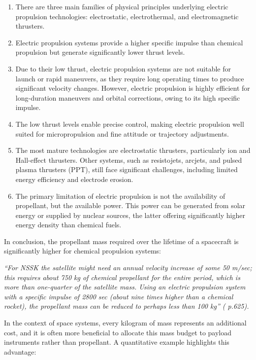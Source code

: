 \begin{enumerate}
	\item There are three main families of physical principles underlying electric propulsion technologies: electrostatic, electrothermal, and electromagnetic thrusters.
	\item Electric propulsion systems provide a higher specific impulse than chemical propulsion but generate significantly lower thrust levels.
	\item Due to their low thrust, electric propulsion systems are not suitable for launch or rapid maneuvers, as they require long operating times to produce significant velocity changes. However, electric propulsion is highly efficient for long-duration maneuvers and orbital corrections, owing to its high specific impulse.
	\item The low thrust levels enable precise control, making electric propulsion well suited for micropropulsion and fine attitude or trajectory adjustments.
	\item The most mature technologies are electrostatic thrusters, particularly ion and Hall-effect thrusters. Other systems, such as resistojets, arcjets, and pulsed plasma thrusters (PPT), still face significant challenges, including limited energy efficiency and electrode erosion.
	\item The primary limitation of electric propulsion is not the availability of propellant, but the available power. This power can be generated from solar energy or supplied by nuclear sources, the latter offering significantly higher energy density than chemical fuels.
\end{enumerate}

In conclusion, the propellant mass required over the lifetime of a spacecraft is significantly higher for chemical propulsion systems:

\begin{center}
\textit{“For NSSK the satellite might need an annual velocity increase of some 50 m/sec; this requires about 750 kg of chemical propellant for the entire period, which is more than one-quarter of the satellite mass. Using an electric propulsion system with a specific impulse of 2800 sec (about nine times higher than a chemical rocket), the propellant mass can be reduced to perhaps less than 100 kg” (\cite{rpe_book} p.625).}
\end{center}

In the context of space systems, every kilogram of mass represents an additional cost, and it is often more beneficial to allocate this mass budget to payload instruments rather than propellant. A quantitative example highlights this advantage:


